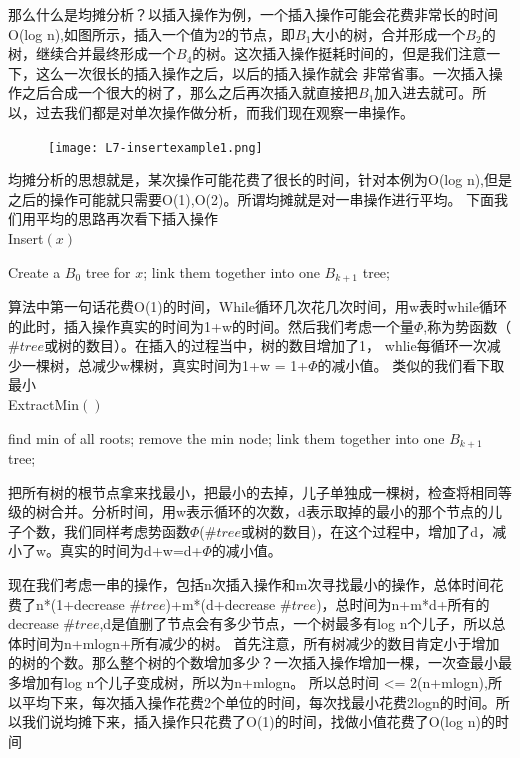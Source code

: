 \newpage
那么什么是均摊分析？以插入操作为例，一个插入操作可能会花费非常长的时间O(log n),如图所示，插入一个值为2的节点，即$B_1$大小的树，合并形成一个$B_2$的树，继续合并最终形成一个$B_4$的树。这次插入操作挺耗时间的，但是我们注意一下，这么一次很长的插入操作之后，以后的插入操作就会
非常省事。一次插入操作之后合成一个很大的树了，那么之后再次插入就直接把$B_1$加入进去就可。所以，过去我们都是对单次操作做分析，而我们现在观察一串操作。
\begin{figure}[!htbp]
\centering
     \texttt{[image: L7-insertexample1.png]}
\end{figure}
均摊分析的思想就是，某次操作可能花费了很长的时间，针对本例为O(log n),但是之后的操作可能就只需要O(1),O(2)。所谓均摊就是对一串操作进行平均。
下面我们用平均的思路再次看下插入操作\\
{\sc Insert}$(x)$
\begin{algorithmic}[1]
\STATE Create a $B_0$ tree for $x$;
\STATE link them together into one $B_{k+1}$ tree; 
\ENDWHILE	
\end{algorithmic}
算法中第一句话花费O(1)的时间，While循环几次花几次时间，用w表时while循环的此时，插入操作真实的时间为1+w的时间。然后我们考虑一个量$\Phi$,称为势函数（$\# tree$或树的数目）。在插入的过程当中，树的数目增加了1， whlie每循环一次减少一棵树，总减少w棵树，真实时间为1+w = 1+$\Phi$的减小值。
类似的我们看下取最小 \\
{\sc ExtractMin}$()$
\begin{algorithmic}[1]
\STATE find min of all roots; 
\STATE remove the min node; 
\STATE link them together into one $B_{k+1}$ tree; 
\ENDWHILE	
\end{algorithmic}

把所有树的根节点拿来找最小，把最小的去掉，儿子单独成一棵树，检查将相同等级的树合并。分析时间，用w表示循环的次数，d表示取掉的最小的那个节点的儿子个数，我们同样考虑势函数$\Phi$($\#tree$或树的数目)，在这个过程中，增加了d，减小了w。真实的时间为d+w=d+$\Phi$的减小值。

现在我们考虑一串的操作，包括n次插入操作和m次寻找最小的操作，总体时间花费了n*(1+decrease $\#tree$)+m*(d+decrease $\#tree$)，总时间为n+m*d+所有的decrease $\#tree$,d是值删了节点会有多少节点，一个树最多有log n个儿子，所以总体时间为n+mlogn+所有减少的树。
首先注意，所有树减少的数目肯定小于增加的树的个数。那么整个树的个数增加多少？一次插入操作增加一棵，一次查最小最多增加有log n个儿子变成树，所以为n+mlogn。
所以总时间 <= 2(n+mlogn),所以平均下来，每次插入操作花费2个单位的时间，每次找最小花费2logn的时间。所以我们说均摊下来，插入操作只花费了O(1)的时间，找做小值花费了O(log n)的时间

